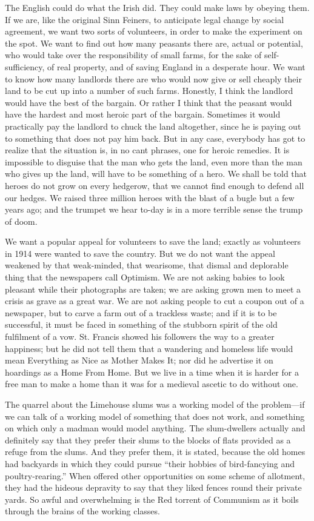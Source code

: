 \documentclass{book}
\begin{document}
The English could do what the Irish did. They could make laws by obeying them. If we are, like the original Sinn Feiners, to anticipate legal change by social agreement, we want two sorts of volunteers, in order to make the experiment on the spot. We want to find out how many peasants there are, actual or potential, who would take over the responsibility of small farms, for the sake of self-sufficiency, of real property, and of saving England in a desperate hour. We want to know how many landlords there are who would now give or sell cheaply their land to be cut up into a number of such farms. Honestly, I think the landlord would have the best of the bargain. Or rather I think that the peasant would have the hardest and most heroic part of the bargain. Sometimes it would practically pay the landlord to chuck the land altogether, since he is paying out to something that does not pay him back. But in any case, everybody has got to realize that the situation is, in no cant phrases, one for heroic remedies. It is impossible to disguise that the man who gets the land, even more than the man who gives up the land, will have to be something of a hero. We shall be told that heroes do not grow on every hedgerow, that we cannot find enough to defend all our hedges. We raised three million heroes with the blast of a bugle but a few years ago; and the trumpet we hear to-day is in a more terrible sense the trump of doom.

We want a popular appeal for volunteers to save the land; exactly as volunteers in 1914 were wanted to save the country. But we do not want the appeal weakened by that weak-minded, that wearisome, that dismal and deplorable thing that the newspapers call Optimism. We are not asking babies to look pleasant while their photographs are taken; we are asking grown men to meet a crisis as grave as a great war. We are not asking people to cut a coupon out of a newspaper, but to carve a farm out of a trackless waste; and if it is to be successful, it must be faced in something of the stubborn spirit of the old fulfilment of a vow. St. Francis showed his followers the way to a greater happiness; but he did not tell them that a wandering and homeless life would mean Everything as Nice as Mother Makes It; nor did he advertise it on hoardings as a Home From Home. But we live in a time when it is harder for a free man to make a home than it was for a medieval ascetic to do without one.

The quarrel about the Limehouse slums was a working model of the problem—if we can talk of a working model of something that does not work, and something on which only a madman would model anything. The slum-dwellers actually and definitely say that they prefer their slums to the blocks of flats provided as a refuge from the slums. And they prefer them, it is stated, because the old homes had backyards in which they could pursue “their hobbies of bird-fancying and poultry-rearing.” When offered other opportunities on some scheme of allotment, they had the hideous depravity to say that they liked fences round their private yards. So awful and overwhelming is the Red torrent of Communism as it boils through the brains of the working classes.
\end{document}
